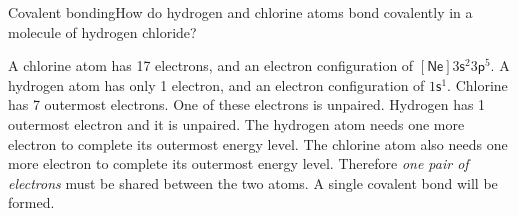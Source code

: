 \begin{wex}{Covalent bonding}{How do hydrogen and chlorine atoms bond covalently in a molecule of hydrogen chloride?}{
A chlorine atom has 17 electrons, and an electron configuration of $\mathsf{[Ne]}3\mathsf{s}^{2}3\mathsf{p}^{5}$. A hydrogen atom has only 1 electron, and an electron configuration of $1\mathsf{s}^{1}$.
Chlorine has 7 outermost electrons. One of these electrons is unpaired. Hydrogen has 1 outermost electron and it is unpaired.
The hydrogen atom needs one more electron to complete its outermost energy level. The chlorine atom also needs one more electron to complete its outermost energy level. Therefore \textit{one pair of electrons} must be shared between the two atoms. A single covalent bond will be formed.
\begin{figure}[H]
\begin{center}
\end{center}
\label{fig:bonding:hydrogen chloride}
\end{figure}
}
\end{wex}
